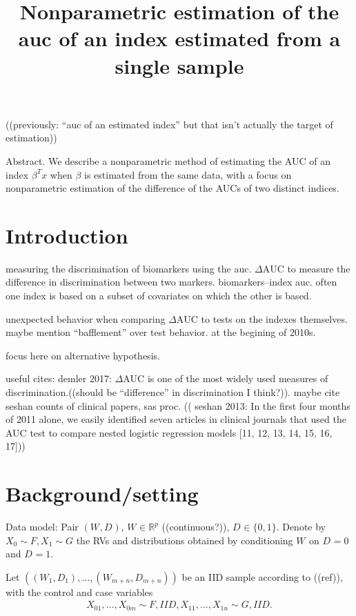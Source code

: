\documentclass[12pt]{article}
\title{Nonparametric estimation of the auc of an index estimated from a single sample}
\date{}
\newcommand{\X}[1][]{X_{0#1}}
\newcommand{\Y}[1][]{X_{1#1}}
\newcommand{\W}[1][]{W_{#1}}
\newcommand{\D}[1][]{D_{#1}}
\renewcommand{\t}[1]{{#1}^T}
\newcommand{\F}{F}
\newcommand{\G}{G}
\newcommand{\m}{m}
\newcommand{\n}{n}
\newcommand{\N}{m+n}
\newcommand{\aucdiff}{\Delta\text{AUC}}
\theoremstyle{definition}
\begin{document}
\maketitle
((previously: ``auc of an estimated index'' but that isn't actually the target of estimation))

Abstract. We describe a nonparametric method of estimating the AUC of
an index $\t\beta x$ when $\beta$ is estimated from the same data, with a
focus on nonparametric estimation of the difference of the AUCs of two
distinct indices.

\section{Introduction}

measuring the discrimination of biomarkers using the auc. $\aucdiff$ to
measure the difference in discrimination between two markers. biomarkers--index auc. often
one index is based on a subset of covariates on which the other is based.

unexpected behavior when comparing $\aucdiff$ to tests on the indexes
themselves. maybe mention ``bafflement'' over test behavior. at the
begining of 2010s.

focus here on alternative hypothesis.

useful cites: 
demler 2017: $\aucdiff$ is one of the most widely used measures of
discrimination.((should be ``difference'' in discrimination I
think?)). maybe cite seshan counts of clinical papers, sas proc. ((
seshan 2013: In the first four months of 2011 alone, we easily
identified seven articles in clinical journals that used the AUC test
to compare nested logistic regression models [11, 12, 13, 14, 15, 16,
17]))


\section{Background/setting}



Data model: Pair $(\W,\D)$, $\W\in\mathbb{R}^p$ ((continuous?)), $\D\in\{0,1\}$. Denote by $\X\sim\F,\Y\sim\G$ the RVs and distributions obtained by conditioning $\W$ on $\D=0$ and $\D=1$.

Let $((\W[1],\D[1]),\ldots,(\W[\N],\D[\N]))$ be an IID sample according to ((ref)), with the control and case variables 
\begin{align}
  \X[1],\ldots,\X[\m] \sim \F,  IID,   \Y[1],\ldots,\Y[\n] \sim \G, IID.
\end{align}
\end{document}
